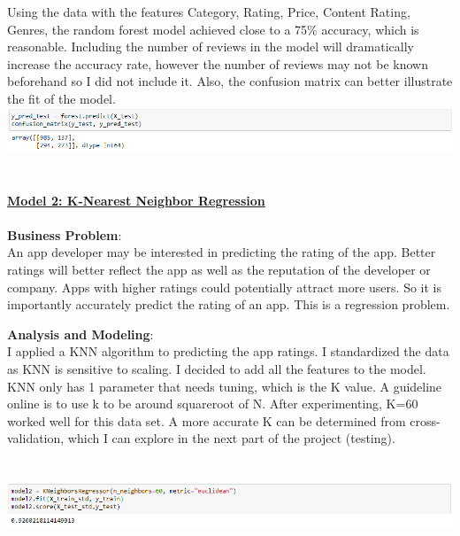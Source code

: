 \documentclass[11pt]{article}
\begin{document}
Using the data with the features Category, Rating, Price, Content Rating, Genres, the random forest model achieved close to a 75\% accuracy, which is reasonable. Including the number of reviews in the model will dramatically increase the accuracy rate, however the number of reviews may not be known beforehand so I did not include it. Also, the confusion matrix can better illustrate the fit of the model. \\
\includegraphics[scale=0.65]{confusion} \\ \\ \\

\underline{\textbf{Model 2: K-Nearest Neighbor Regression}}\\ \\
\textbf{Business Problem}: \\
An app developer may be interested in predicting the rating of the app. Better ratings will better reflect the app as well as the reputation of the developer or company. Apps with higher ratings could potentially attract more users. So it is importantly accurately predict the rating of an app. This is a regression problem.

\textbf{Analysis and Modeling}: \\
I applied a KNN algorithm to predicting the app ratings.  I standardized the data as KNN is sensitive to scaling. I decided to add all the features to the model. KNN only has 1 parameter that needs tuning, which is the K value. A guideline online is to use k to be around squareroot of N. After experimenting, K=60 worked well for this data set. A more accurate K can be determined from cross-validation, which I can explore in the next part of the project (testing). \\ \\ \\
\includegraphics[scale=0.65]{KNN2} \\ 
\end{document}

